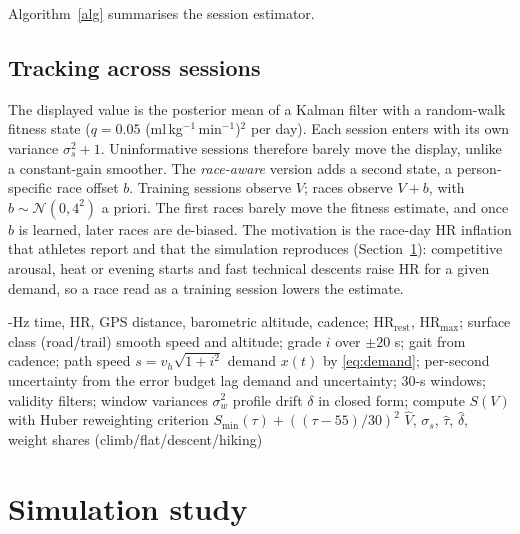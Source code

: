 \documentclass[11pt,a4paper]{article}
\newcommand{\unit}{ml\,kg$^{-1}$\,min$^{-1}$}
\newcommand{\HRmax}{\ensuremath{\mathrm{HR}_{\max}}}
\newcommand{\HRrest}{\ensuremath{\mathrm{HR}_{\mathrm{rest}}}}
\newcommand{\ascent}{ASCENT}
\begin{document}
Algorithm~\ref{alg} summarises the session estimator.

\subsection{Tracking across sessions}
The displayed value is the posterior mean of a Kalman filter \citep{kalman1960} with a random-walk fitness state ($q=0.05$ (\unit)$^2$ per day). Each session enters with its own variance $\sigma_s^2+1$. Uninformative sessions therefore barely move the display, unlike a constant-gain smoother. The \emph{race-aware} version adds a second state, a person-specific race offset $b$. Training sessions observe $V$; races observe $V+b$, with $b\sim\mathcal N(0,4^2)$ a priori. The first races barely move the fitness estimate, and once $b$ is learned, later races are de-biased. The motivation is the race-day HR inflation that athletes report and that the simulation reproduces (Section~\ref{sec:sim}): competitive arousal, heat or evening starts and fast technical descents raise HR for a given demand, so a race read as a training session lowers the estimate.

\begin{algorithm}[!htbp]
\caption{\ascent{} for one session (all steps vectorised; about 0.05--0.2 s per session in Python)}\label{alg}
\begin{algorithmic}[1]
-Hz time, HR, GPS distance, barometric altitude, cadence; \HRrest, \HRmax; surface class (road/trail)
\State smooth speed and altitude; grade $i$ over $\pm20$ s; gait from cadence; path speed $s=v_h\sqrt{1+i^2}$
\State demand $x(t)$ by \eqref{eq:demand}; per-second uncertainty from the error budget
  \State lag demand and uncertainty; 30-s windows; validity filters; window variances $\sigma_w^2$
   \State profile drift $\delta$ in closed form; compute $S(V)$ with Huber reweighting \EndFor
  \State criterion $S_{\min}(\tau)+((\tau-55)/30)^2$
\EndFor
\State \Return $\hat V$, $\sigma_s$, $\hat\tau$, $\hat\delta$, weight shares (climb/flat/descent/hiking)
\end{algorithmic}
\end{algorithm}

\section{Simulation study}\label{sec:sim}
\end{document}
